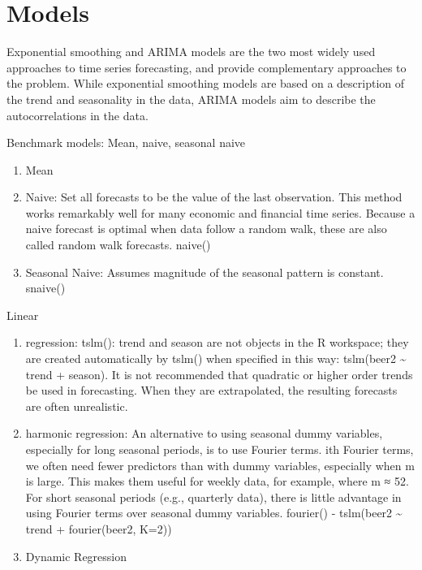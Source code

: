 \documentclass[]{book}
\theoremstyle{definition}
\theoremstyle{definition}
\theoremstyle{definition}
\theoremstyle{remark}
\begin{document}
\section{Models}\label{models}

Exponential smoothing and ARIMA models are the two most widely used
approaches to time series forecasting, and provide complementary
approaches to the problem. While exponential smoothing models are based
on a description of the trend and seasonality in the data, ARIMA models
aim to describe the autocorrelations in the data.

Benchmark models: Mean, naive, seasonal naive

\begin{enumerate}
\def\labelenumi{\arabic{enumi}.}
\setcounter{enumi}{-1}
\item
  Mean
\item
  Naive: Set all forecasts to be the value of the last observation. This
  method works remarkably well for many economic and financial time
  series. Because a naive forecast is optimal when data follow a random
  walk, these are also called random walk forecasts. naive()
\item
  Seasonal Naive: Assumes magnitude of the seasonal pattern is constant.
  snaive()
\end{enumerate}

Linear

\begin{enumerate}
\def\labelenumi{\arabic{enumi}.}
\setcounter{enumi}{9}
\item
  regression: tslm(): trend and season are not objects in the R
  workspace; they are created automatically by tslm() when specified in
  this way: tslm(beer2 \textasciitilde{} trend + season). It is not
  recommended that quadratic or higher order trends be used in
  forecasting. When they are extrapolated, the resulting forecasts are
  often unrealistic.
\item
  harmonic regression: An alternative to using seasonal dummy variables,
  especially for long seasonal periods, is to use Fourier terms. ith
  Fourier terms, we often need fewer predictors than with dummy
  variables, especially when m is large. This makes them useful for
  weekly data, for example, where m ≈ 52. For short seasonal periods
  (e.g., quarterly data), there is little advantage in using Fourier
  terms over seasonal dummy variables. fourier() - tslm(beer2
  \textasciitilde{} trend + fourier(beer2, K=2))
\item
  Dynamic Regression
\end{enumerate}
\end{document}

